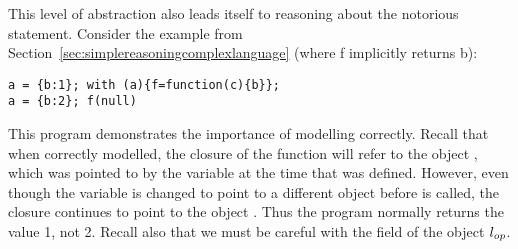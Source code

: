 \documentclass{article}
\begin{document}
%
This level of abstraction also leads itself to reasoning about the notorious  statement. Consider the  example from Section~\ref{sec:simplereasoningcomplexlanguage} (where \js f implicitly returns \js b):
%
\begin{verbatim}a = {b:1}; with (a){f=function(c){b}};
a = {b:2}; f(null)
\end{verbatim}
%
This program demonstrates the importance of modelling 
correctly. Recall that when correctly modelled, the closure of the
function  will refer to the object , which was
pointed to by the variable  at the time that  was defined.
However, even though the variable  is changed to point to a
different object before  is called, the closure continues
to point to the object . Thus the program normally returns
the value 1, not 2. Recall also that we must be careful with the
 field of the object $l_{op}$.
\end{document}
